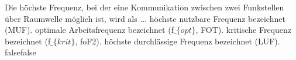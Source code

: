     {Die höchste Frequenz, bei der eine Kommunikation zwischen zwei Funkstellen über Raumwelle möglich ist, wird als ...}
    {höchste nutzbare Frequenz bezeichnet (MUF).}
    {optimale Arbeitsfrequenz bezeichnet (f$\_\{opt\}$, FOT).
}
    {kritische Frequenz bezeichnet (f$\_\{krit\}$, foF2).}
    {höchste durchlässige Frequenz bezeichnet (LUF).}
    {false}{false}